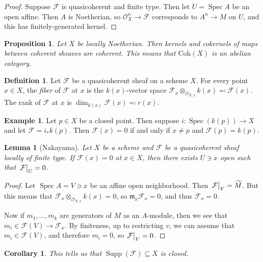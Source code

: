 \documentclass[leqno, openany]{memoir}
\newtheorem{cor}[thm]{Corollary}
\newtheorem{prop}[thm]{Proposition}
\newtheorem{lem}[thm]{Lemma}
\theoremstyle{definition}
\newtheorem{defn}[thm]{Definition}
\newtheorem{exm}[thm]{Example}
\theoremstyle{remark}
\theoremstyle{plain}
\theoremstyle{definition}
\theoremstyle{remark}
\newcommand{\mc}[1]{\mathcal{#1}}
\newcommand{\mf}[1]{\mathfrak{#1}}
\newcommand{\mr}[1]{\mathrm{#1}}
\newcommand{\wt}[1]{\widetilde{#1}}
\DeclareMathOperator{\Supp}{Supp}
\DeclareMathOperator{\Spec}{Spec}
\begin{document}
\begin{proof} Suppose $\mc{F}$ is quasicoherent and finite type. Then let $U =
\Spec A$ be an open affine. Then $A$ is Noetherian, so $\mc{O}_X^n \to \mc{F}$
corresponds to $A^n \to M$ on $U$, and this has finitely-generated kernel.
\end{proof}

\begin{prop} Let $X$ be locally Noetherian. Then kernels and cokernels of maps
between coherent sheaves are coherent. This means that $\mr{Coh}(X)$ is an
abelian category.  \end{prop}

\begin{defn} Let $\mc{F}$ be a quasicoherent sheaf on a scheme $X$. For every
    point $x \in X$, the \textit{fiber} of $\mc{F}$ at $x$ is the $k(x)$-vector
    space $\mc{F}_x \otimes_{\mc{O}_{X,x}} k(x) \eqqcolon \mc{F}(x)$. The rank
    of $\mc{F}$ at $x$ is $\dim_{k(x)} \mc{F}(x) \eqqcolon r(x)$.  \end{defn}

\begin{exm} Let $p \in X$ be a closed point. Then suppose $i \colon \Spec
(k(p)) \to X$ and let $\mc{F}  = i_* k(p)$. Then $\mc{F}(x) = 0$ if and only if
$x \neq p$ and $\mc{F}(p) = k(p)$.  \end{exm}

\begin{lem}[Nakayama] Let $X$ be a scheme and $\mc{F}$ be a quasicoherent sheaf
locally of finite type. If $\mc{F}(x) = 0$ at $x \in X$, then there exists $U
\ni x$ open such that $\eval{\mc{F}}_U = 0$.  \end{lem}

\begin{proof} Let $\Spec A = V \ni x$ be an affine open neighborhood. Then
    $\eval{\mc{F}}_V = \wt{M}$. But this means that $\mc{F}_x
    \otimes_{\mc{O}_{X,x}} k(x) = 0$, so $\mf{m}_x \mc{F}_x = 0$, and thus
    $\mc{F}_x = 0$.

    Now if $m_1, \ldots, m_k$ are generators of $M$ as an $A$-module, then we
see that $m_i \in \mc{F}(V) \to \mc{F}_x$. By finiteness, up to restricting
$v$, we can assume that $m_i \in \mc{F}(V)$, and therefore $m_i = 0$, so
$\eval{\mc{F}}_V = 0$.  \end{proof}

\begin{cor} This tells us that $\Supp (\mc{F}) \subseteq X$ is closed.
\end{cor}
\end{document}
